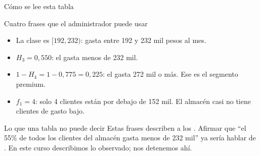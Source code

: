\documentclass[aspectratio=169,10pt]{beamer}
\begin{document}
\begin{frame}{Cómo se lee esta tabla}
  \scriptsize
  \begin{block}{Cuatro frases que el administrador puede usar}
    \scriptsize
    \begin{itemize}\setlength{\itemsep}{0.04cm}
      \item La clase  es $[192, 232)$:  gasta entre 192 y 232 mil pesos al mes.
      \item $H_3 = 0{,}550$: el  gasta menos de 232 mil.
      \item $1 - H_4 = 1-0{,}775 = 0{,}225$: el  gasta 272
            mil o más. Ese es el segmento premium.
      \item $f_1 = 4$: solo 4 clientes están por debajo de 152 mil. El almacén
            casi no tiene clientes de gasto bajo.
    \end{itemize}
  \end{block}

  \vspace{0.1cm}
  \begin{alertblock}{Lo que una tabla no puede decir}
    \scriptsize
    Estas frases describen a los . Afirmar que
    ``el 55\% de todos los clientes del almacén gasta menos de 232 mil''
    ya sería hablar de . En este
    curso describimos lo observado; nos detenemos ahí.
  \end{alertblock}
\end{frame}
\end{document}
